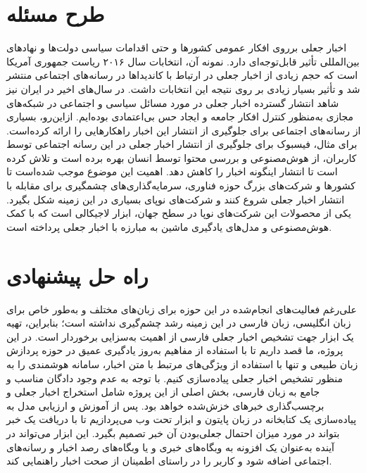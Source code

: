 \section{طرح مسئله}
اخبار جعلی برروی افکار  عمومی کشورها و حتی اقدامات سیاسی دولت‌ها و نهادهای بین‌المللی تأثیر قابل‌توجه‌ای دارد. نمونه آن، انتخابات سال ۲۰۱۶  ریاست جمهوری آمریکا است که حجم زیادی از اخبار جعلی در ارتباط با کاندیداها در رسانه‌های اجتماعی منتشر شد و تأثیر بسیار  زیادی بر روی نتیجه این انتخابات داشت. در سال‌های اخیر در ایران نیز شاهد انتشار گسترده اخبار جعلی در مورد مسائل سیاسی  و اجتماعی در شبکه‌های مجازی به‌منظور کنترل افکار جامعه و ایجاد حس بی‌اعتمادی بوده‌ایم. ازاین‌رو، بسیاری از رسانه‌های اجتماعی برای جلوگیری از انتشار این اخبار راهکارهایی را ارائه کرده‌است. برای مثال، فیسبوک برای جلوگیری از انتشار اخبار  جعلی در این رسانه اجتماعی توسط کاربران، از هوش‌مصنوعی و بررسی محتوا توسط انسان بهره برده‌ است و تلاش کرده‌ است تا انتشار  اینگونه اخبار را کاهش دهد. اهمیت این موضوع موجب شده‌است تا کشورها و شرکت‌های بزرگ حوزه فناوری، سرمایه‌گذاری‌های چشمگیری برای مقابله با انتشار اخبار جعلی شروع کنند و شرکت‌های نوپای بسیاری در این زمینه شکل بگیرد. یکی از محصولات  این شرکت‌های نوپا در سطح جهان، ابزار لاجیکالی است که با کمک هوش‌مصنوعی و مدل‌های یادگیری ماشین به مبارزه با اخبار جعلی پرداخته است.

\section{راه حل پیشنهادی}
 علی‌رغم فعالیت‌های انجام‌شده در این حوزه برای زبان‌های مختلف و به‌طور خاص برای زبان انگلیسی، زبان فارسی در این زمینه رشد چشم‌گیری نداشته است؛ بنابراین، تهیه یک ابزار جهت تشخیص اخبار جعلی فارسی از اهمیت به‌سزایی برخوردار است. در این پروژه، ما قصد داریم تا با استفاده از مفاهیم به‌روز یادگیری عمیق در حوزه پردازش زبان طبیعی و تنها با استفاده از ویژگی‌های مرتبط با متن اخبار، سامانه‌ هوشمندی را به منظور تشخیص اخبار جعلی پیاده‌سازی کنیم. با توجه به عدم وجود دادگان مناسب و جامع به زبان فارسی، بخش اصلی از این پروژه شامل استخراج اخبار جعلی و برچسب‌گذاری خبر‌های خزش‌شده خواهد بود. پس از آموزش و ارزیابی مدل به پیاده‌سازی یک کتابخانه در زبان پایتون و ابزار تحت وب می‌پردازیم تا با دریافت یک خبر بتواند در مورد میزان احتمال جعلی‌بودن آن خبر تصمیم بگیرد. این ابزار می‌تواند در آینده به‌عنوان یک افزونه به وبگاه‌های خبری و یا وبگاه‌های رصد اخبار و رسانه‌های اجتماعی اضافه شود و کاربر را در  راستای اطمینان از صحت اخبار راهنمایی کند.